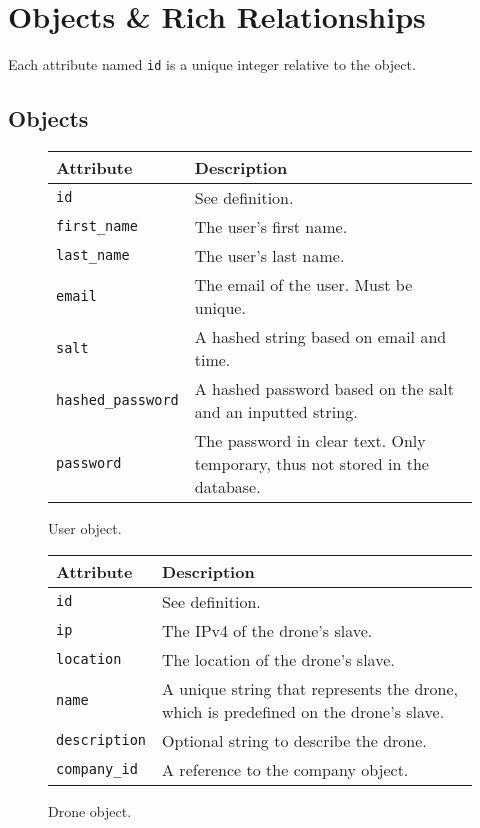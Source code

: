 \label{app:objects}
\chapter{Objects \& Rich Relationships}

Each attribute named \verb+id+ is a unique integer relative to the object.

\section{Objects}
\begin{figure}[htb]
\begin{center}
\begin{tabular}{ | l | p{8cm} | }
  \hline
    \textbf{Attribute} & \textbf{Description} \\ \hline
    \verb+id+ & See definition.\\ \hline
    \verb+first_name+ & The user's first name.\\ \hline
    \verb+last_name+ & The user's last name.\\ \hline
    \verb+email+ & The email of the user. Must be unique.\\ \hline
    \verb+salt+ & A hashed string based on email and time.\\ \hline
    \verb+hashed_password+ & A hashed password based on the salt and an inputted string.\\ \hline
    \verb+password+ & The password in clear text. Only temporary, thus not stored in the database.\\ \hline
\end{tabular}
\caption{User object.}
\label{tab:user_object}
\end{center}
\end{figure}

\begin{figure}[htb]
\begin{center}
\begin{tabular}{ | l | p{8cm} | }
  \hline
    \textbf{Attribute} & \textbf{Description} \\ \hline
    \verb+id+ & See definition.\\ \hline
    \verb+ip+ & The IPv4 of the drone's slave.\\ \hline
    \verb+location+ & The location of the drone's slave.\\ \hline
    \verb+name+ & A unique string that represents the drone, which is predefined on the drone's slave.\\ \hline
    \verb+description+ & Optional string to describe the drone.\\ \hline
    \verb+company_id+ & A reference to the company object.\\ \hline
\end{tabular}
\caption{Drone object.}
\label{tab:drone_object}
\end{center}
\end{figure}

